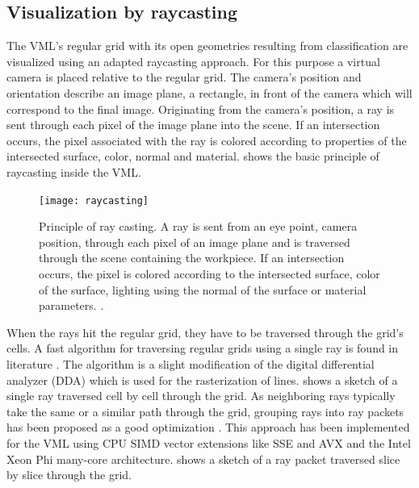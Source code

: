 \subsection{Visualization by raycasting}
\label{sec:raycasting}

The VML's regular grid with its open geometries resulting from classification are visualized using an adapted raycasting approach.
For this purpose a virtual camera is placed relative to the regular grid.
The camera's position and orientation describe an image plane, \ie a rectangle, in front of the camera which will correspond to the final image.
Originating from the camera's position, a ray is sent through each pixel of the image plane into the scene.
If an intersection occurs, the pixel associated with the ray is colored according to properties of the intersected surface, \eg color, normal and material.
 shows the basic principle of raycasting inside the VML.

\begin{figure}
	\centering
	\texttt{[image: raycasting]}
	\caption{
		Principle of ray casting.
		A ray is sent from an eye point, \ie camera position, through each pixel of an image plane and is traversed through the scene containing the workpiece.
		If an intersection occurs, the pixel is colored according to the intersected surface, \protect\eg color of the surface, lighting using the normal of the surface or material parameters.
		\cite{enlight_demo_workshop}.
	}
	\label{fig:raycasting_principle}
\end{figure}

When the rays hit the regular grid, they have to be traversed through the grid's cells.
A fast algorithm for traversing regular grids using a single ray is found in literature \cite{3DDDA}.
The algorithm is a slight modification of the digital differential analyzer (DDA) which is used for the rasterization of lines.
 shows a sketch of a single ray traversed cell by cell through the grid.
%
As neighboring rays typically take the same or a similar path through the grid, grouping rays into ray packets has been proposed as a good optimization \cite{packet_caster}.
This approach has been implemented for the VML using CPU SIMD vector extensions like SSE and AVX  \cite{enlight} and the Intel Xeon Phi many-core architecture.
 shows a sketch of a ray packet traversed slice by slice through the grid.

